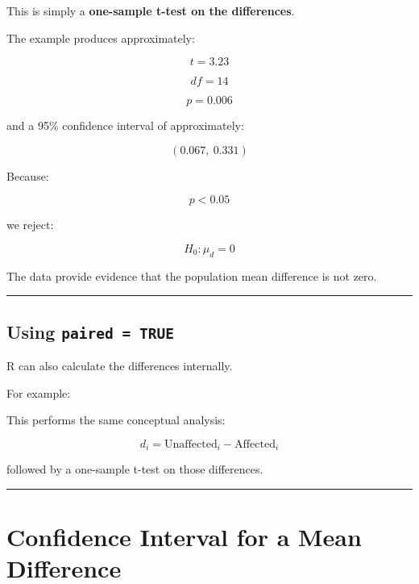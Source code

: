 \documentclass[
  letterpaper,
  DIV=11,
  numbers=noendperiod]{scrreprt}
\newenvironment{Shaded}{\begin{snugshade}}{\end{snugshade}}
\newcommand{\AttributeTok}[1]{\textcolor[rgb]{0.40,0.45,0.13}{#1}}
\newcommand{\ConstantTok}[1]{\textcolor[rgb]{0.56,0.35,0.01}{#1}}
\newcommand{\FunctionTok}[1]{\textcolor[rgb]{0.28,0.35,0.67}{#1}}
\newcommand{\NormalTok}[1]{\textcolor[rgb]{0.00,0.23,0.31}{#1}}
\newcommand{\SpecialCharTok}[1]{\textcolor[rgb]{0.37,0.37,0.37}{#1}}
\begin{document}
This is simply a \textbf{one-sample t-test on the differences}.

The example produces approximately:

\[
t=3.23
\]

\[
df=14
\]

\[
p=0.006
\]

and a 95\% confidence interval of approximately:

\[
(0.067,\ 0.331)
\]

Because:

\[
p<0.05
\]

we reject:

\[
H_0:\mu_d=0
\]

The data provide evidence that the population mean difference is not
zero.

\begin{center}\rule{0.5\linewidth}{0.5pt}\end{center}

\section{\texorpdfstring{Using
\texttt{paired\ =\ TRUE}}{Using paired = TRUE}}\label{using-paired-true}

R can also calculate the differences internally.

For example:

\begin{Shaded}
\end{Shaded}

This performs the same conceptual analysis:

\[
d_i
=
\text{Unaffected}_i
-
\text{Affected}_i
\]

followed by a one-sample t-test on those differences.

\begin{center}\rule{0.5\linewidth}{0.5pt}\end{center}


\chapter{Confidence Interval for a Mean
Difference}\label{confidence-interval-for-a-mean-difference}
\end{document}
